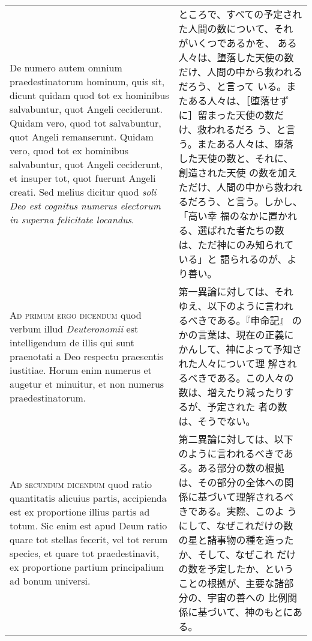 \documentclass[10pt]{jsarticle} %
\begin{document}
\begin{longtable}{p{21em}p{21em}}
\\

De numero autem omnium
praedestinatorum hominum, quis sit, dicunt quidam quod tot ex hominibus
salvabuntur, quot Angeli ceciderunt. Quidam vero, quod tot salvabuntur,
quot Angeli remanserunt. Quidam vero, quod tot ex hominibus salvabuntur,
quot Angeli ceciderunt, et insuper tot, quot fuerunt Angeli creati. Sed
melius dicitur quod {\itshape soli Deo est cognitus numerus electorum in superna
felicitate locandus}.


&


ところで、すべての予定された人間の数について、それがいくつであるかを、
ある人々は、堕落した天使の数だけ、人間の中から救われるだろう、と言って
いる。またある人々は、［堕落せずに］留まった天使の数だけ、救われるだろ
う、と言う。またある人々は、堕落した天使の数と、それに、創造された天使
の数を加えただけ、人間の中から救われるだろう、と言う。しかし、「高い幸
福のなかに置かれる、選ばれた者たちの数は、ただ神にのみ知られている」と
語られるのが、より善い。


\\


{\scshape Ad primum ergo dicendum} quod verbum illud
{\itshape Deuteronomii} est intelligendum de illis qui sunt praenotati a Deo
respectu praesentis iustitiae. Horum enim numerus et augetur et
minuitur, et non numerus praedestinatorum.


&

第一異論に対しては、それゆえ、以下のように言われるべきである。『申命記』
のかの言葉は、現在の正義にかんして、神によって予知された人々について理
解されるべきである。この人々の数は、増えたり減ったりするが、予定された
者の数は、そうでない。



\\


{\scshape Ad secundum dicendum} quod ratio quantitatis
alicuius partis, accipienda est ex proportione illius partis ad
totum. Sic enim est apud Deum ratio quare tot stellas fecerit, vel tot
rerum species, et quare tot praedestinavit, ex proportione partium
principalium ad bonum universi.


&


第二異論に対しては、以下のように言われるべきである。ある部分の数の根拠
は、その部分の全体への関係に基づいて理解されるべきである。実際、このよ
うにして、なぜこれだけの数の星と諸事物の種を造ったか、そして、なぜこれ
だけの数を予定したか、ということの根拠が、主要な諸部分の、宇宙の善への
比例関係に基づいて、神のもとにある。


\end{longtable}
\end{document}
